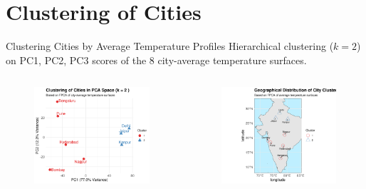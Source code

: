 \documentclass[svgnames, 12pt]{beamer}
\begin{document}
\section{Clustering of Cities}
\begin{frame}{Clustering Cities by Average Temperature Profiles}
  Hierarchical clustering ($k=2$) on PC1, PC2, PC3 scores of the 8 city-average temperature surfaces.
  \begin{columns}[T]
    \begin{column}{0.5\textwidth}
      \begin{figure}
        \includegraphics[width=\linewidth]{../data/output/figures/pca_clusters_city_avg.png}
      \end{figure}
    \end{column}
    \begin{column}{0.5\textwidth}
      \begin{figure}
        \includegraphics[width=\linewidth]{../data/output/figures/cluster_map_india.png}

\end{figure}
\end{column}
\end{columns}
\end{frame}
\end{document}

